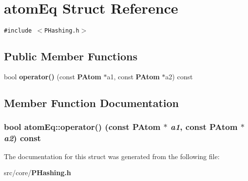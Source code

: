 \section{atom\-Eq Struct Reference}
\label{structatomEq}
{\tt \#include $<$PHashing.h$>$}

\subsection*{Public Member Functions}
\begin{CompactItemize}
\item 
bool {\bf operator()} (const {\bf PAtom} $\ast$a1, const {\bf PAtom} $\ast$a2) const
\end{CompactItemize}


\subsection{Member Function Documentation}
\subsubsection{\setlength{\rightskip}{0pt plus 5cm}bool atom\-Eq::operator() (const {\bf PAtom} $\ast$ {\em a1}, const {\bf PAtom} $\ast$ {\em a2}) const\hspace{0.3cm}{\tt  [inline]}}\label{structatomEq_98a5c9ffaba503d291072d3c1319b185}




The documentation for this struct was generated from the following file:\begin{CompactItemize}
\item 
src/core/{\bf PHashing.h}\end{CompactItemize}
